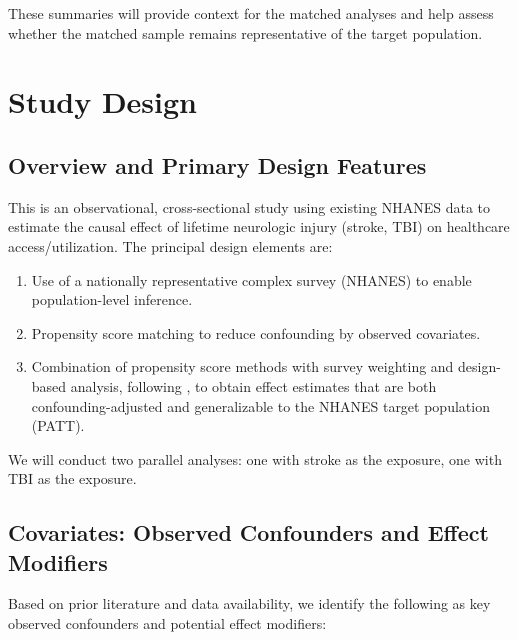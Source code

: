 \documentclass{article}
\begin{document}
These summaries will provide context for the matched analyses and help assess whether the matched sample remains representative of the target population.

\section{Study Design}
\label{sec:design}

\subsection{Overview and Primary Design Features}

This is an observational, cross-sectional study using existing NHANES data to estimate the causal effect of lifetime neurologic injury (stroke, TBI) on healthcare access/utilization. The principal design elements are:

\begin{enumerate}
    \item Use of a nationally representative complex survey (NHANES) to enable population-level inference.

    \item Propensity score matching to reduce confounding by observed covariates.

    \item Combination of propensity score methods with survey weighting and design-based analysis, following \citet{dugoff2014}, to obtain effect estimates that are both confounding-adjusted and generalizable to the NHANES target population (PATT).

\end{enumerate}

We will conduct two parallel analyses: one with stroke as the exposure, one with TBI as the exposure.

\subsection{Covariates: Observed Confounders and Effect Modifiers}

Based on prior literature and data availability, we identify the following as key observed confounders and potential effect modifiers:
\end{document}
